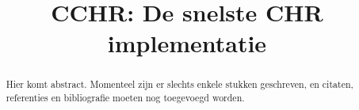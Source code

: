 \documentclass[12pt]{article}
\title{CCHR: De snelste CHR implementatie}
\begin{document}
\begin{coverpage} 

% 
% 
% 
% 
%  

\begin{abstract}
Hier komt abstract. Momenteel zijn er slechts enkele stukken geschreven, en citaten, referenties en bibliografie moeten nog toegevoegd worden.
\end{abstract}

\end{coverpage}		%
\end{document}
